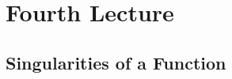 \setchapterpreamble[u]{\margintoc}
\chapter{Fourth Lecture}

\section{Singularities of a Function}

\blindtext 